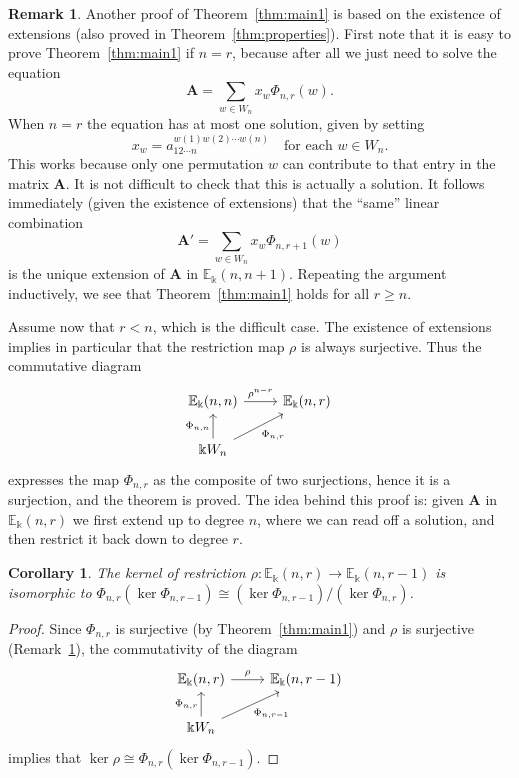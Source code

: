 \documentclass[10pt]{article}
\newtheorem{coro}[theorem]{Corollary}
\theoremstyle{definition}
\newtheorem{rema}[theorem]{Remark}
\newcommand{\E}{\mathbb{E}}
\newcommand{\bA}{\mathbf{A}}
\begin{document}
\begin{rema}\label{rmk:alt-pf}
Another proof of Theorem~\ref{thm:main1} is based on the existence of
extensions (also proved in Theorem~\ref{thm:properties}). First note
that it is easy to prove Theorem~\ref{thm:main1} if $n=r$, because
after all we just need to solve the equation
\[
\bA = \textstyle \sum_{w \in W_n} x_w \Phi_{n,r}(w). 
\]
When $n=r$ the equation has at most one solution, given by setting
\[
x_w = a_{12\cdots n}^{w(1)w(2)\cdots w(n)} \quad \text{for each $w \in W_n$}.
\]
This works because only one permutation $w$ can contribute to that
entry in the matrix $\bA$. It is not difficult to check that this is
actually a solution. It follows immediately (given the existence of
extensions) that the ``same'' linear combination
\[
\bA' = \sum_{w \in W_n} x_w \Phi_{n,r+1}(w)
\]
is the unique extension of $\bA$ in $\E_\Bbbk(n,n+1)$. Repeating the
argument inductively, we see that Theorem~\ref{thm:main1} holds for
all $r \ge n$.

Assume now that $r<n$, which is the difficult case. The existence of
extensions implies in particular that the restriction map $\rho$ is
always surjective. Thus the commutative diagram
\[
\begin{tikzcd}
\E_\Bbbk(n,n) \arrow[r, "\rho^{n-r}"] & \E_\Bbbk(n,r) \\
\Bbbk W_n \arrow[u, "\Phi_{n,n}"] \arrow[ur, "\Phi_{n,r}"']
\end{tikzcd}
\]
expresses the map $\Phi_{n,r}$ as the composite of two surjections,
hence it is a surjection, and the theorem is proved. The idea behind
this proof is: given $\bA$ in $\E_\Bbbk(n,r)$ we first extend up to
degree $n$, where we can read off a solution, and then restrict it
back down to degree $r$.
\end{rema}



\begin{coro}\label{cor:ker-of-rho}
 The kernel of restriction $\rho: \E_\Bbbk(n,r) \to \E_\Bbbk(n,r-1)$
 is isomorphic to $\Phi_{n,r}(\ker \Phi_{n,r-1}) \cong (\ker
 \Phi_{n,r-1})/(\ker \Phi_{n,r})$.
\end{coro}

\begin{proof}
Since $\Phi_{n,r}$ is surjective (by Theorem~\ref{thm:main1}) and
$\rho$ is surjective (Remark~\ref{rmk:alt-pf}), the commutativity of
the diagram
\[
\begin{tikzcd}
\E_\Bbbk(n,r) \arrow[r, "\rho"] & \E_\Bbbk(n,r-1) \\
\Bbbk W_n \arrow[u, "\Phi_{n,r}"] \arrow[ur, "\Phi_{n,r-1}"']
\end{tikzcd}
\]
implies that $\ker \rho \cong \Phi_{n,r}(\ker \Phi_{n,r-1})$. 
\end{proof}
\end{document}

